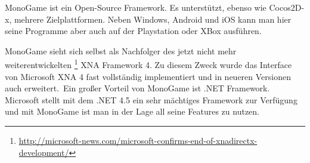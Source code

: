 MonoGame ist ein Open-Source \CS Framework. Es unterstützt, ebenso wie Cocos2D-x, mehrere Zielplattformen. Neben Windows, Android und iOS kann man hier seine Programme aber auch auf der Playstation oder XBox ausführen.

MonoGame sieht sich selbst als Nachfolger des jetzt nicht mehr weiterentwickelten \footnote{\url{http://microsoft-news.com/microsoft-confirms-end-of-xnadirectx-development/}} XNA Framework 4. Zu diesem Zweck wurde das Interface von Microsoft XNA 4 fast vollständig implementiert und in neueren Versionen auch erweitert.\
Ein großer Vorteil von MonoGame ist .NET Framework. Microsoft stellt mit dem .NET 4.5 ein sehr mächtiges Framework zur Verfügung und mit MonoGame ist man in der Lage all seine Features zu nutzen.
